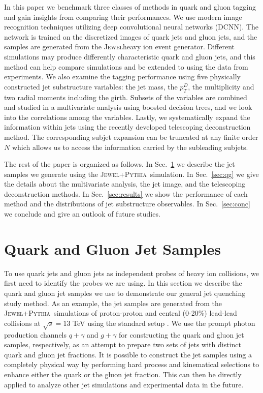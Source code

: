 \documentclass[notoc]{JHEP3}
\newcommand{\jw}{\textsc{Jewel}}
\newcommand{\jwpy}{\textsc{Jewel+Pythia}}
\begin{document}
In this paper we benchmark three classes of methods in quark and gluon tagging and gain insights from comparing their performances. We use modern image recognition techniques utilizing deep convolutional neural networks (DCNN). The network is trained on the discretized images of quark jets and gluon jets, and the samples are generated from the \jw heavy ion event generator. Different simulations may produce differently characteristic quark and gluon jets, and this method can help compare simulations and be extended to using the data from experiments. We also examine the tagging performance using five physically constructed jet substructure variables: the jet mass, the $p_T^D$, the multiplicity and two radial moments including the girth. Subsets of the variables are combined and studied in a multivariate analysis using boosted decision trees, and we look into the correlations among the variables. Lastly, we systematically expand the information within jets using the recently developed telescoping deconstruction method. The corresponding subjet expansion can be truncated at any finite order $N$ which allows us to access the information carried by the subleading subjets.

The rest of the paper is organized as follows. In Sec.~\ref{sec:sample} we describe the jet samples we generate using the \jwpy ~simulation. In Sec.~\ref{sec:qg} we give the details about the multivariate analysis, the jet image, and the telescoping deconstruction methods. In Sec.~\ref{sec:results} we show the performance of each method and the distributions of jet substructure observables. In Sec.~\ref{sec:conc} we conclude and give an outlook of future studies.




\section{Quark and Gluon Jet Samples}
\label{sec:sample}

To use quark jets and gluon jets as independent probes of heavy ion collisions, we first need to identify the probes we are using. In this section we describe the quark and gluon jet samples we use to demonstrate our general jet quenching study method. As an example, the jet samples are generated from the \jwpy ~simulations of proton-proton and central (0-20\%) lead-lead collisions at $\sqrt{s}=13$ TeV using the standard setup \cite{Zapp:2013zya}. We use the prompt photon production channels \cite{KunnawalkamElayavalli:2016ttl} $q +\gamma$ and $g +\gamma$ for constructing the quark and gluon jet samples, respectively, as an attempt to prepare two sets of jets with distinct quark and gluon jet fractions. It is possible to construct the jet samples using a completely physical way by performing hard process and kinematical selections to enhance either the quark or the gluon jet fraction. This can then be directly applied to analyze other jet simulations and experimental data in the future.
\end{document}
